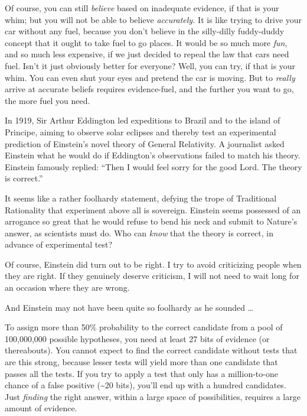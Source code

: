 {
 Of course, you can still \textit{believe} based on inadequate
evidence, if that is your whim; but you will not be able to believe
\textit{accurately.} It is like trying to drive your car without any
fuel, because you don't believe in the silly-dilly
fuddy-duddy concept that it ought to take fuel to go places. It would
be so much more \textit{fun}, and so much less expensive, if we just
decided to repeal the law that cars need fuel. Isn't it
just obviously better for everyone? Well, you can try, if that is your
whim. You can even shut your eyes and pretend the car is moving. But to
\textit{really} arrive at accurate beliefs requires evidence-fuel, and
the further you want to go, the more fuel you need.}

\myendsectiontext


{
 In 1919, Sir Arthur Eddington led expeditions to Brazil and to the
island of Principe, aiming to observe solar eclipses and thereby test
an experimental prediction of Einstein's novel theory
of General Relativity. A journalist asked Einstein what he would do if
Eddington's observations failed to match his theory.
Einstein famously replied: ``Then I would feel sorry
for the good Lord. The theory is correct.'' }

{
 It seems like a rather foolhardy statement, defying the trope of
Traditional Rationality that experiment above all is sovereign.
Einstein seems possessed of an arrogance so great that he would refuse
to bend his neck and submit to Nature's answer, as
scientists must do. Who can \textit{know} that the theory is correct,
in advance of experimental test?}

{
 Of course, Einstein did turn out to be right. I try to avoid
criticizing people when they are right. If they genuinely deserve
criticism, I will not need to wait long for an occasion where they are
wrong.}

{
 And Einstein may not have been quite so foolhardy as he sounded
\ldots}

{
 To assign more than 50\% probability to the correct candidate from
a pool of 100,000,000 possible hypotheses, you need at least 27 bits of
evidence (or thereabouts). You cannot expect to find the correct
candidate without tests that are this strong, because lesser tests will
yield more than one candidate that passes all the tests. If you try to
apply a test that only has a million-to-one chance of a false positive
(\~{}20 bits), you'll end up with a hundred candidates.
Just \textit{finding} the right answer, within a large space of
possibilities, requires a large amount of evidence.}

